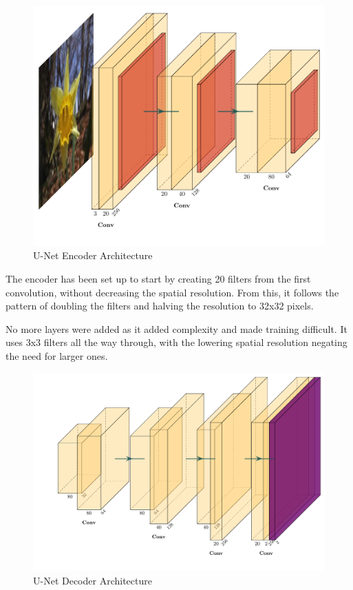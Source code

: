 \documentclass{article}
\begin{document}
\begin{figure}[H]
    \centering
    \includegraphics[width=\linewidth]{unetEncode.pdf}
    \caption{U-Net Encoder Architecture}
\end{figure}

The encoder has been set up to start by creating 20 filters from the first convolution, without decreasing the spatial resolution. From this, it follows the pattern of doubling the filters and halving the resolution to 32x32 pixels. 

No more layers were added as it added complexity and made training difficult. It uses 3x3 filters all the way through, with the lowering spatial resolution negating the need for larger ones.

\begin{figure}[H]
    \centering
    \includegraphics[width=\linewidth]{unetDecode.pdf}
    \caption{U-Net Decoder Architecture}
\end{figure}
\end{document}
